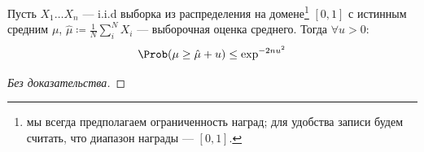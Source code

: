 \begin{theorem}
\setcounter{footnote}{1}
Пусть $X_1 \dots X_n$ --- i.i.d выборка из распределения на домене\footnote{мы всегда предполагаем ограниченность наград; для удобства записи будем считать, что диапазон награды --- $[0, 1]$.} $[0, 1]$ с истинным средним $\mu$, $\hat{\mu} \coloneqq \frac{1}{N} \sum_i^N X_i$ --- выборочная оценка среднего. Тогда $\forall u > 0$:
$$\Prob(\mu \ge \hat{\mu} + u) \le \exp^{-2nu^2}$$
\begin{proof}[Без доказательства]
\end{proof}

\end{theorem}

